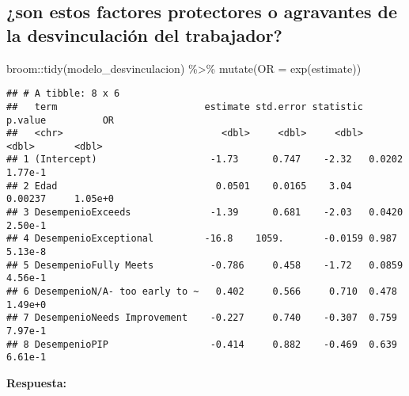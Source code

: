 \documentclass[
]{article}
\newenvironment{Shaded}{\begin{snugshade}}{\end{snugshade}}
\newcommand{\AttributeTok}[1]{\textcolor[rgb]{0.77,0.63,0.00}{#1}}
\newcommand{\FunctionTok}[1]{\textcolor[rgb]{0.00,0.00,0.00}{#1}}
\newcommand{\NormalTok}[1]{#1}
\newcommand{\SpecialCharTok}[1]{\textcolor[rgb]{0.00,0.00,0.00}{#1}}
\begin{document}
\hypertarget{son-estos-factores-protectores-o-agravantes-de-la-desvinculaciuxf3n-del-trabajador}{%
\subsection{¿son estos factores protectores o agravantes de la
desvinculación del
trabajador?}\label{son-estos-factores-protectores-o-agravantes-de-la-desvinculaciuxf3n-del-trabajador}}

\begin{Shaded}
\begin{Highlighting}[]
\NormalTok{broom}\SpecialCharTok{::}\FunctionTok{tidy}\NormalTok{(modelo\_desvinculacion) }\SpecialCharTok{\%\textgreater{}\%} \FunctionTok{mutate}\NormalTok{(}\AttributeTok{OR  =} \FunctionTok{exp}\NormalTok{(estimate))}
\end{Highlighting}
\end{Shaded}

\begin{verbatim}
## # A tibble: 8 x 6
##   term                          estimate std.error statistic p.value          OR
##   <chr>                            <dbl>     <dbl>     <dbl>   <dbl>       <dbl>
## 1 (Intercept)                    -1.73      0.747    -2.32   0.0202      1.77e-1
## 2 Edad                            0.0501    0.0165    3.04   0.00237     1.05e+0
## 3 DesempenioExceeds              -1.39      0.681    -2.03   0.0420      2.50e-1
## 4 DesempenioExceptional         -16.8    1059.       -0.0159 0.987       5.13e-8
## 5 DesempenioFully Meets          -0.786     0.458    -1.72   0.0859      4.56e-1
## 6 DesempenioN/A- too early to ~   0.402     0.566     0.710  0.478       1.49e+0
## 7 DesempenioNeeds Improvement    -0.227     0.740    -0.307  0.759       7.97e-1
## 8 DesempenioPIP                  -0.414     0.882    -0.469  0.639       6.61e-1
\end{verbatim}

\textbf{Respuesta:}
\end{document}
